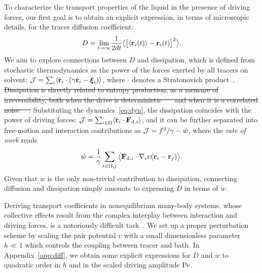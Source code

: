 \documentclass[superscriptaddress, twocolumn, prx, longbibliography, nofootinbib]{revtex4-1}
\providecommand{\DIFdeltex}[1]{{\protect\color{red}\sout{#1}}}                      %
\providecommand{\DIFdelbegin}{} %
\providecommand{\DIFdelend}{} %
\providecommand{\DIFdel}[1]{\texorpdfstring{\DIFdeltex{#1}}{}} %
\begin{document}
To characterize the transport properties of the liquid in the presence of driving forces, our first goal is to obtain an explicit expression, in terms of microscopic details, for the tracer diffusion coefficient:
\begin{equation}
	D = \underset{t\to\infty}{\lim} \frac{1}{2dt} \big\langle \big[\langle{\bf r}_i(t)\rangle-{\bf r}_i(t)\big]^2 \big\rangle .
\end{equation}
We aim to explore connections between $D$ and dissipation, which is defined from stochastic thermodynamics as the power of the forces exerted by all tracers on solvent: ${\cal J} = \sum_i\langle\dot{\bf r}_i\cdot(\gamma\dot{\bf r}_i-{\boldsymbol\xi}_i)\rangle$, where $\cdot$ denotes a Stratonovich product~\cite{Sekimoto1998, Seifert2012}. \DIFdelbegin \DIFdel{Dissipation is directly related to entropy production, as a measure of irreversibility, both when the drive is deterministic~\mbox{%
\cite{Sekimoto1998, Seifert2012} }%
and when it is a correlated noise~\mbox{%
\cite{Mandal2017, Seifert2018, Shankar2018, Bo2019}}%
. }\DIFdelend Substituting the dynamics~\eqref{eq:dyn}, the dissipation coincides with the power of driving forces: ${\cal J} = \sum_{i\in\Omega}\langle\dot{\bf r}_i\cdot{\bf F}_{{\rm d},i}\rangle$, and it can be further separated into free-motion and interaction contributions as ${\cal J} = f^2/\gamma - \dot w$, where the {\it rate of work} reads
\begin{equation}\label{eq:work}
	\dot w = \frac{1}{\gamma} \sum_{i\in\Omega,j}\big\langle {\bf F}_{{\rm d},i}\cdot\nabla_iv({\bf r}_i-{\bf r}_j)\big\rangle.
\end{equation}
Given that $\dot w$ is the only non-trivial contribution to dissipation, connecting diffusion and dissipation simply amounts to expressing $D$ in terms of $\dot w$.


Deriving transport coefficients in nonequilibrium many-body systems, whose collective effects result from the complex interplay between interaction and driving forces, is a notoriously difficult task~\cite{Voituriez2016, Brady2017, Stenhammar2017, Tailleur2017, Illien2018}. We set up a proper perturbation scheme by scaling the pair potential $v$ with a small dimensionless parameter $h\ll1$ which controls the coupling between tracer and bath. In Appendix~\ref{app:diff}, we obtain some explicit expressions for $D$ and $\dot w$ to quadratic order in $h$ and in the scaled driving amplitude $\rm Pe$.
\end{document}
